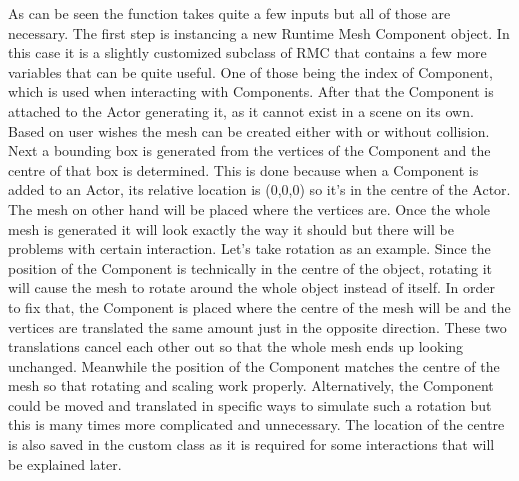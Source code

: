 As can be seen the function takes quite a few inputs but all of those are necessary. The first step is instancing a new Runtime Mesh Component object. In this case it is a slightly customized subclass of \acs{RMC} that contains a few more variables that can be quite useful. One of those being the index of Component, which is used when interacting with Components. After that the Component is attached to the Actor generating it, as it cannot exist in a scene on its own. Based on user wishes the mesh can be created either with or without collision. Next a bounding box is generated from the vertices of the Component and the centre of that box is determined. This is done because when a Component is added to an Actor, its relative location is (0,0,0) so it's in the centre of the Actor. The mesh on other hand will be placed where the vertices are. Once the whole mesh is generated it will look exactly the way it should but there will be problems with certain interaction. Let's take rotation as an example. Since the position of the Component is technically in the centre of the object, rotating it will cause the mesh to rotate around the whole object instead of itself. In order to fix that, the Component is placed where the centre of the mesh will be and the vertices are translated the same amount just in the opposite direction. These two translations cancel each other out so that the whole mesh ends up looking unchanged. Meanwhile the position of the Component matches the centre of the mesh so that rotating and scaling work properly. Alternatively, the Component could be moved and translated in specific ways to simulate such a rotation but this is many times more complicated and unnecessary. The location of the centre is also saved in the custom class as it is required for some interactions that will be explained later.\\
